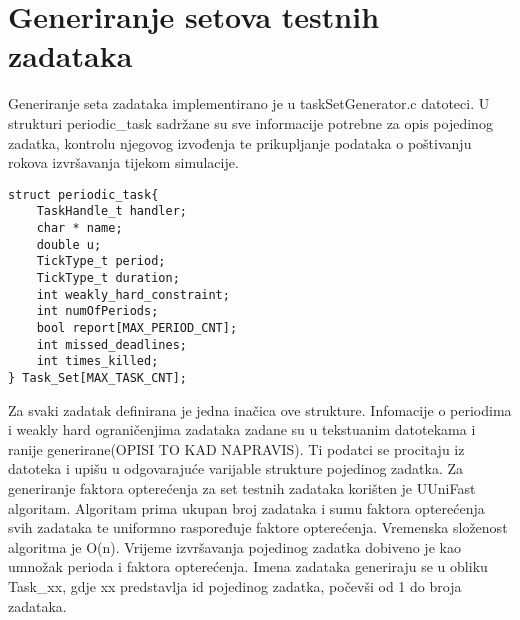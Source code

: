 \documentclass[../zavrsni.tex]{subfiles}
\begin{document}
\section{Generiranje setova testnih zadataka}




Generiranje seta zadataka implementirano je u taskSetGenerator.c datoteci. U strukturi periodic\_task sadržane su sve 
informacije potrebne za opis pojedinog zadatka, kontrolu njegovog izvođenja te prikupljanje podataka o poštivanju rokova 
izvršavanja tijekom simulacije.
\begin{lstlisting}[style=CStyle,caption={Struktura periodic\_task},captionpos=b]
struct periodic_task{
    TaskHandle_t handler;
    char * name;
    double u;
    TickType_t period;
    TickType_t duration;
    int weakly_hard_constraint;
    int numOfPeriods;
    bool report[MAX_PERIOD_CNT];
    int missed_deadlines;
    int times_killed;
} Task_Set[MAX_TASK_CNT];
\end{lstlisting}
Za svaki zadatak definirana je jedna inačica ove strukture. Infomacije o periodima i weakly hard ograničenjima zadataka 
zadane su u tekstuanim datotekama i ranije generirane(OPISI TO KAD NAPRAVIS).
Ti podatci se procitaju iz datoteka i upišu u odgovarajuće varijable strukture pojedinog zadatka.
Za generiranje faktora opterećenja za set testnih zadataka korišten je UUniFast algoritam. Algoritam prima ukupan broj zadataka 
i sumu faktora opterećenja svih zadataka te uniformno raspoređuje faktore opterećenja. Vremenska složenost algoritma je O(n).
Vrijeme izvršavanja pojedinog zadatka dobiveno je kao umnožak perioda i faktora opterećenja.
Imena zadataka generiraju se u obliku Task\_xx, gdje xx predstavlja id pojedinog zadatka, počevši od 1 do broja zadataka.
\end{document}
